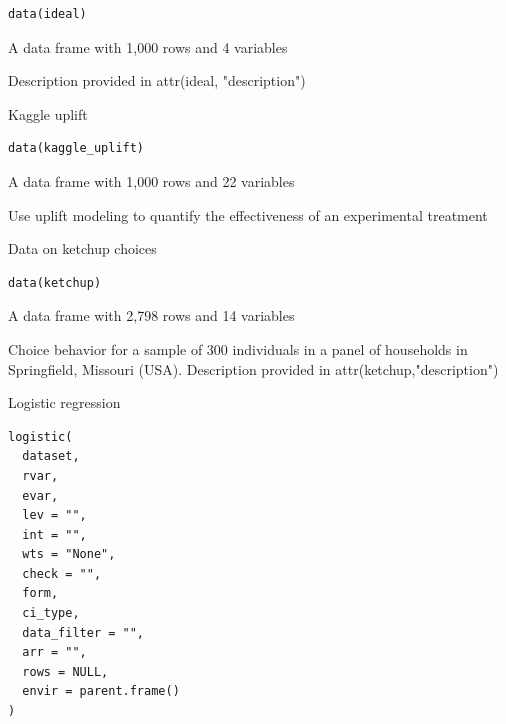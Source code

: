 \documentclass[a4paper]{book}
\begin{document}
%
\begin{Usage}
\begin{verbatim}
data(ideal)
\end{verbatim}
\end{Usage}
%
\begin{Format}
A data frame with 1,000 rows and 4 variables
\end{Format}
%
\begin{Details}
Description provided in attr(ideal,  "description")
\end{Details}
%
\begin{Description}
Kaggle uplift
\end{Description}
%
\begin{Usage}
\begin{verbatim}
data(kaggle_uplift)
\end{verbatim}
\end{Usage}
%
\begin{Format}
A data frame with 1,000 rows and 22 variables
\end{Format}
%
\begin{Details}
Use uplift modeling to quantify the effectiveness of an experimental treatment
\end{Details}
%
\begin{Description}
Data on ketchup choices
\end{Description}
%
\begin{Usage}
\begin{verbatim}
data(ketchup)
\end{verbatim}
\end{Usage}
%
\begin{Format}
A data frame with 2,798 rows and 14 variables
\end{Format}
%
\begin{Details}
Choice behavior for a sample of 300 individuals in a panel of households in Springfield, Missouri (USA). Description provided in attr(ketchup,"description")
\end{Details}
%
\begin{Description}
Logistic regression
\end{Description}
%
\begin{Usage}
\begin{verbatim}
logistic(
  dataset,
  rvar,
  evar,
  lev = "",
  int = "",
  wts = "None",
  check = "",
  form,
  ci_type,
  data_filter = "",
  arr = "",
  rows = NULL,
  envir = parent.frame()
)
\end{verbatim}
\end{Usage}
\end{document}
